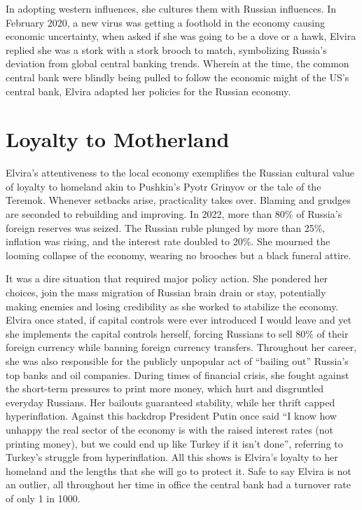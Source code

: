 \documentclass[12pt]{article}
\begin{document}
In adopting western influences, she cultures them with Russian influences. In February 2020, a new virus was getting a foothold in the economy causing economic uncertainty, when asked if she was going to be a dove or a hawk, Elvira replied she was a stork with a stork brooch to match, symbolizing Russia’s deviation from global central banking trends.  Wherein at the time, the common central bank were blindly being pulled to follow the economic might of the US's central bank, Elvira adapted her policies for the Russian economy.  



\section{Loyalty to Motherland
\label{sec:Loyalty}}
Elvira’s attentiveness to the local economy exemplifies the Russian cultural value of loyalty to homeland akin to Pushkin’s Pyotr Grinyov or the tale of the Teremok. Whenever setbacks arise, practicality takes over. Blaming and grudges are seconded to rebuilding and improving. In 2022, more than 80\% of Russia’s foreign reserves was seized. The Russian ruble plunged by more than 25\%, inflation was rising, and the interest rate doubled to 20\%. She mourned the looming collapse of the economy, wearing no brooches but a black funeral attire.

It was a dire situation that required major policy action.  She pondered her choices, join the mass migration of Russian brain drain or stay, potentially making enemies and losing credibility as she worked to stabilize the economy. Elvira once stated, if capital controls were ever introduced I would leave and yet she implements the capital controls herself, forcing Russians to sell 80\% of their foreign currency while banning foreign currency transfers. Throughout her career, she was also responsible for the publicly unpopular act of “bailing out” Russia’s top banks and oil companies.  During times of financial crisis, she fought against the short-term pressures to print more money, which hurt and disgruntled everyday Russians. Her bailouts guaranteed stability, while her thrift capped hyperinflation.  Against this backdrop President Putin once said “I know how unhappy the real sector of the economy is with the raised interest rates (not printing money), but we could end up like Turkey if it isn’t done”, referring to Turkey’s struggle from hyperinflation. All this shows is Elvira’s loyalty to her homeland and the lengths that she will go to protect it. Safe to say Elvira is not an outlier, all throughout her time in office the central bank had a turnover rate of only 1 in 1000. 
\end{document}

